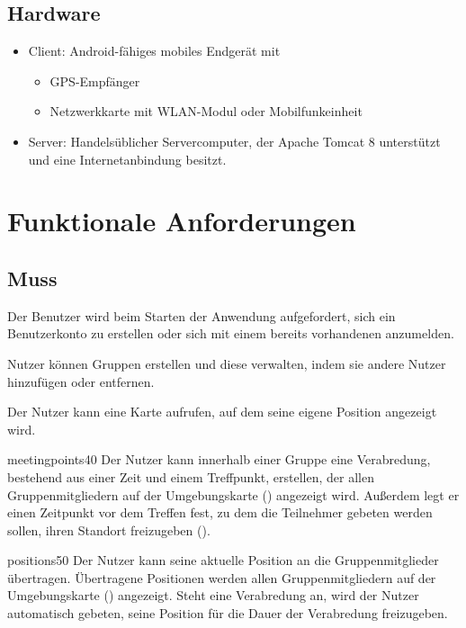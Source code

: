\documentclass[parskip=full,11pt]{scrartcl}
\begin{document}
\subsection{Hardware}
\begin{itemize}
    \item Client: Android-fähiges mobiles Endgerät mit
        \begin{itemize}
            \item GPS-Empfänger
            \item Netzwerkkarte mit WLAN-Modul oder Mobilfunkeinheit
        \end{itemize}
    \item Server: Handelsüblicher Servercomputer, der Apache Tomcat 8
        unterstützt und eine Internetanbindung besitzt.
\end{itemize}

\pagebreak
\section{Funktionale Anforderungen}

\subsection{Muss}

%
Der Benutzer wird beim Starten der Anwendung aufgefordert, sich ein
Benutzerkonto zu erstellen oder sich mit einem bereits vorhandenen anzumelden.

%
Nutzer können Gruppen erstellen und diese verwalten, indem sie andere Nutzer
hinzufügen oder entfernen.

%
Der Nutzer kann eine Karte aufrufen, auf dem seine eigene Position angezeigt
wird.

    {meetingpoints}{40}
%
Der Nutzer kann innerhalb einer Gruppe eine Verabredung, bestehend aus einer
Zeit und einem Treffpunkt, erstellen, der allen Gruppenmitgliedern auf der
Umgebungskarte () angezeigt wird.
Außerdem legt er einen Zeitpunkt vor dem Treffen fest,
zu dem die Teilnehmer gebeten werden sollen,
ihren Standort freizugeben ().

    {positions}{50}
%
Der Nutzer kann seine aktuelle Position an die Gruppenmitglieder übertragen.
Übertragene Positionen werden allen Gruppenmitgliedern auf der Umgebungskarte
() angezeigt.
Steht eine Verabredung an, wird der Nutzer automatisch gebeten, seine Position
für die Dauer der Verabredung freizugeben.
\end{document}
